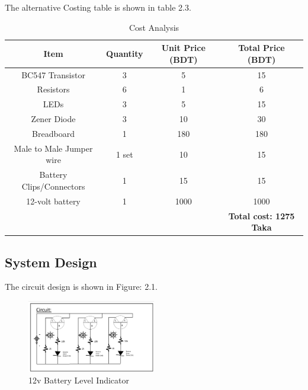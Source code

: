 The alternative Costing table is shown in table 2.3.
\begin{table}[h!]
\centering
\begin{tabular}{|  c  |c|c|c|}
\hline
\textbf{      Item      } & \textbf{  Quantity  } & \textbf{ Unit Price (BDT) } & \textbf{  Total Price (BDT)  }  \\
\hline
 BC547 Transistor &  3  & 5 & 15    \\
\hline
 Resistors &  6 &	1 &	6   \\

\hline
LEDs &	3 &	5 &	15    \\
\hline
Zener Diode	 & 3  &	10 &	30 \\
\hline
Breadboard  & 1 & 180 &180 \\
\hline
Male to Male Jumper wire  & 1 set & 10  & 15 \\
\hline
Battery Clips/Connectors	& 1 &	15 &	15\\
\hline
12-volt battery & 1 & 1000 & 1000\\
\hline
 & &  &\textbf{Total cost: 1275 Taka}\\
\hline

\end{tabular}
\caption{Cost Analysis }
\end{table}
\newline
\newline
\newline
\newline
\newline
\pagebreak
\subsection{System Design}

The circuit design is shown in Figure: 2.1.
\begin{figure}[h!] %
    \centering
    \includegraphics[width=0.5\textwidth]{Diagram.png} %
    \caption{12v Battery Level Indicator}
    \label{fig:sample}
\end{figure}
